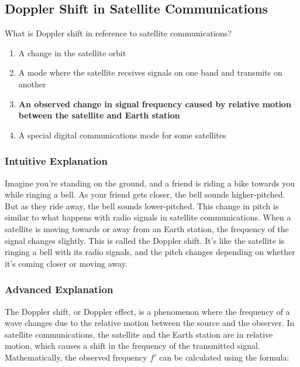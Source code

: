 \subsection{Doppler Shift in Satellite Communications}
\label{T8B07}

\begin{tcolorbox}[colback=gray!10!white,colframe=black!75!black,title=T8B07]
What is Doppler shift in reference to satellite communications?
\begin{enumerate}[label=\Alph*)]
    \item A change in the satellite orbit
    \item A mode where the satellite receives signals on one band and transmits on another
    \item \textbf{An observed change in signal frequency caused by relative motion between the satellite and Earth station}
    \item A special digital communications mode for some satellites
\end{enumerate}
\end{tcolorbox}

\subsubsection{Intuitive Explanation}
Imagine you're standing on the ground, and a friend is riding a bike towards you while ringing a bell. As your friend gets closer, the bell sounds higher-pitched. But as they ride away, the bell sounds lower-pitched. This change in pitch is similar to what happens with radio signals in satellite communications. When a satellite is moving towards or away from an Earth station, the frequency of the signal changes slightly. This is called the Doppler shift. It's like the satellite is ringing a bell with its radio signals, and the pitch changes depending on whether it's coming closer or moving away.

\subsubsection{Advanced Explanation}
The Doppler shift, or Doppler effect, is a phenomenon where the frequency of a wave changes due to the relative motion between the source and the observer. In satellite communications, the satellite and the Earth station are in relative motion, which causes a shift in the frequency of the transmitted signal. Mathematically, the observed frequency \( f' \) can be calculated using the formula:

